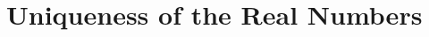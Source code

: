 \section{Uniqueness of the Real Numbers}
\label{urn}


\begin{theorem} %
	\label{urn:t:urn}
	\TBD
\end{theorem}